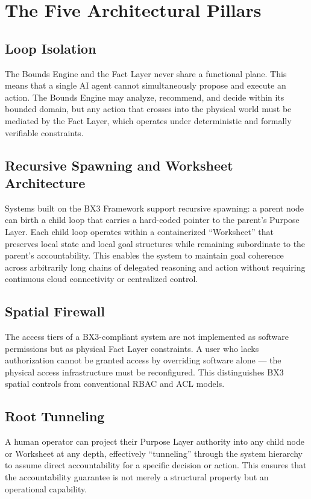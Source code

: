 \documentclass[11pt, a4paper]{article}
\begin{document}
\section{The Five Architectural Pillars}
\subsection{Loop Isolation}
The Bounds Engine and the Fact Layer never share a functional plane. This means that a single AI agent cannot simultaneously propose and execute an action. The Bounds Engine may analyze, recommend, and decide within its bounded domain, but any action that crosses into the physical world must be mediated by the Fact Layer, which operates under deterministic and formally verifiable constraints.
\subsection{Recursive Spawning and Worksheet Architecture}
Systems built on the BX3 Framework support recursive spawning: a parent node can birth a child loop that carries a hard-coded pointer to the parent's Purpose Layer. Each child loop operates within a containerized ``Worksheet'' that preserves local state and local goal structures while remaining subordinate to the parent's accountability. This enables the system to maintain goal coherence across arbitrarily long chains of delegated reasoning and action without requiring continuous cloud connectivity or centralized control.
\subsection{Spatial Firewall}
The access tiers of a BX3-compliant system are not implemented as software permissions but as physical Fact Layer constraints. A user who lacks authorization cannot be granted access by overriding software alone --- the physical access infrastructure must be reconfigured. This distinguishes BX3 spatial controls from conventional RBAC and ACL models.
\subsection{Root Tunneling}
A human operator can project their Purpose Layer authority into any child node or Worksheet at any depth, effectively ``tunneling'' through the system hierarchy to assume direct accountability for a specific decision or action. This ensures that the accountability guarantee is not merely a structural property but an operational capability.
\end{document}
